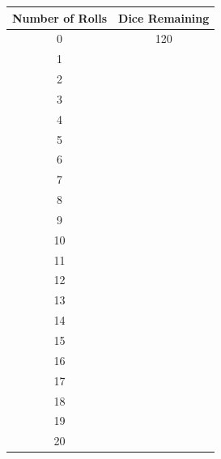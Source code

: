 \documentclass[11pt]{article}
\begin{document}
\huge
\begin{center}
	\begin{tabular}{|c|c|}
		\hline
		Number of Rolls & Dice Remaining \\ \hline
		0               & 120            \\ \hline
		1               &                \\ \hline
		2               &                \\ \hline
		3               &                \\ \hline
		4               &                \\ \hline
		5               &                \\ \hline
		6               &                \\ \hline
		7               &                \\ \hline
		8               &                \\ \hline
		9               &                \\ \hline
		10              &                \\ \hline
		11              &                \\ \hline
		12              &                \\ \hline
		13              &                \\ \hline
		14              &                \\ \hline
		15              &                \\ \hline
		16              &                \\ \hline
		17              &                \\ \hline
		18              &                \\ \hline
		19              &                \\ \hline
		20              &                \\ \hline
	\end{tabular}
\end{center}

\newpage
\end{document}

